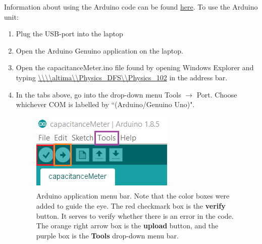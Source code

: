 \documentclass[12pt]{report}
\begin{document}
\noindent Information about using the Arduino code can be found \href{https://www.arduino.cc/en/Tutorial/CapacitanceMeter}{here}. To use the Arduino unit:
\begin{enumerate}
\item Plug the USB-port into the laptop
\item Open the Arduino Genuino application on the laptop.
\item Open the capacitanceMeter.ino file found by opening Windows Explorer and typing \url{\\\\altima\\Physics_DFS\\Physics_102} in the address bar.

\item In the tabs above, go into the drop-down menu Tools $\rightarrow$ Port. Choose whichever COM is labelled by ``(Arduino/Genuino Uno)".
\begin{figure}[H]
\centering
\includegraphics[width=0.5 \textwidth]{lab1-Arduino-menu-bar.png}
\caption{Arduino application menu bar. Note that the color boxes were added to guide the eye. The red checkmark box is the \textbf{verify} button. It serves to verify whether there is an error in the code. The orange right arrow box is the \textbf{upload} button, and the purple box is the \textbf{Tools} drop-down menu bar.}
\label{Fig:ArduinoMenuBar}
\end{figure}


\end{enumerate}
\end{document}
